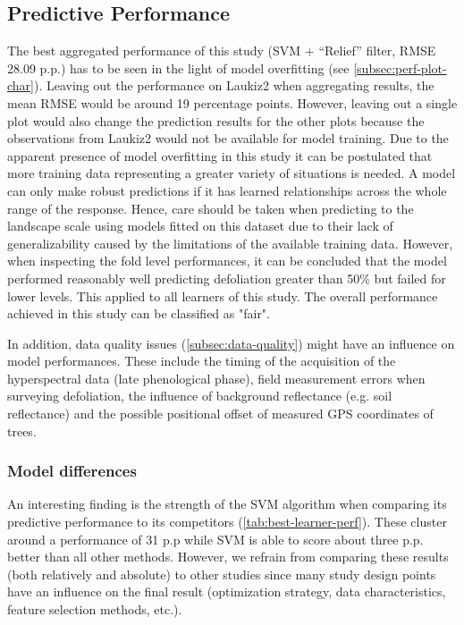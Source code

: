 \documentclass[journal]{IEEEtran}
\begin{document}
\subsection{Predictive Performance}

The best aggregated performance of this study (SVM + \enquote{Relief} filter, RMSE 28.09 p.p.) has to be seen in the light of model overfitting (see \autoref{subsec:perf-plot-char}).
Leaving out the performance on Laukiz2 when aggregating results, the mean RMSE would be around 19 percentage points.
However, leaving out a single plot would also change the prediction results for the other plots because the observations from Laukiz2 would not be available for model training.
Due to the apparent presence of model overfitting in this study it can be postulated that more training data representing a greater variety of situations is needed.
A model can only make robust predictions if it has learned relationships across the whole range of the response.
Hence, care should be taken when predicting to the landscape scale using models fitted on this dataset due to their lack of generalizability caused by the limitations of the available training data.
However, when inspecting the fold level performances, it can be concluded that the model performed reasonably well predicting defoliation greater than 50\% but failed for lower levels.
This applied to all learners of this study.
The overall performance achieved in this study can be classified as "fair".

In addition, data quality issues (\autoref{subsec:data-quality}) might have an influence on model performances.
These include the timing of the acquisition of the hyperspectral data (late phenological phase), field measurement errors when surveying defoliation, the influence of background reflectance (e.g. soil reflectance) and the possible positional offset of measured GPS coordinates of trees.

\subsubsection{Model differences}

An interesting finding is the strength of the SVM algorithm when comparing its predictive performance to its competitors (\autoref{tab:best-learner-perf}).
These cluster around a performance of 31 p.p while SVM is able to score about three p.p. better than all other methods.
However, we refrain from comparing these results (both relatively and absolute) to other studies since many study design points have an influence on the final result (optimization strategy, data characteristics, feature selection methods, etc.).
\end{document}
